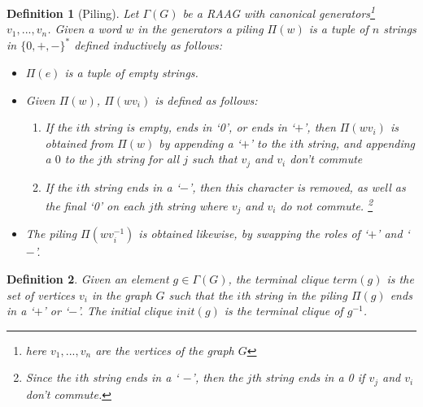 \documentclass[12pt]{article}
\newtheorem{defin}{Definition}
\begin{document}
\begin{defin}[Piling]
	Let $ \Gamma(G) $ be a RAAG with canonical generators\footnote{here $ v _{1}, ..., v _{n} $ are the vertices of the graph $ G $} $ v _{1}, ..., v _{n} $. Given a word $ w$ in the generators a piling $ \Pi (w) $ is a tuple of $ n $ strings in $ \{ 0,+,- \} ^{*} $ defined inductively as follows:
	\begin{itemize} 
		\item $ \Pi (e) $ is a tuple of empty strings.
		\item Given $ \Pi(w) $, $ \Pi (wv _{i}) $ is defined as follows: 

			\begin{enumerate} 
				\item If the $ i $th string is empty, ends in `0', or ends in `$+$', then $ \Pi(wv _{i}) $ is obtained from $ \Pi(w) $ by appending a `$ + $' to the $ i $th string, and appending a $ 0 $ to the $ j $th string for all $ j $ such that $ v _{j} $ and $ v _{i} $ don't commute
				\item If the $ i $th string ends in a `$ - $', then this character is removed, as well as the final `0' on each $ j $th string where $ v _{j} $ and $ v _{i} $ do not commute. \footnote{Since the $ i $th string ends in a ` $ - $', then the $ j $th string ends in a 0 if $ v _{j} $ and $ v _{i} $ don't commute.}
				  \end{enumerate} 
			  \item The piling $ \Pi(wv _{i} ^{-1})  $ is obtained likewise, by swapping the roles of `$ + $' and `$ - $'.
	 \end{itemize}
	  \end{defin}

\begin{defin} 
	Given an element $ g \in \Gamma(G) $, the terminal clique $ term(g) $ is the set of vertices $ v _{i} $ in the graph $ G $ such that the $ i $th string in the piling $ \Pi(g) $ ends in a `$ + $' or `$ - $'. The initial clique $ init(g) $ is the terminal clique of $ g ^{-1} $. 
	  \end{defin}
\end{document}
